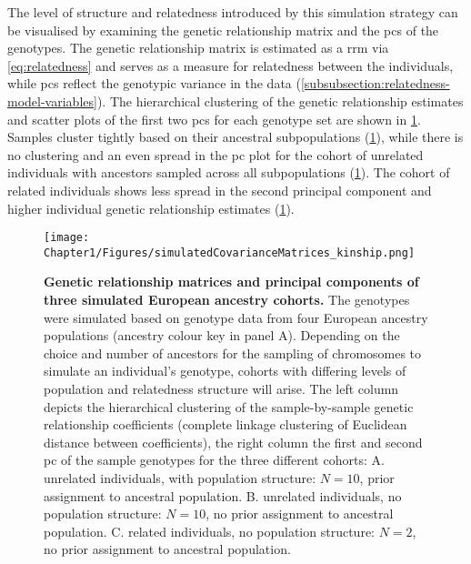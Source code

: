 The level of structure and relatedness introduced by this simulation strategy can be visualised by examining the genetic relationship matrix and the \glspl{pc} of the genotypes. The genetic relationship matrix is estimated as a \gls{rrm} via \cref{eq:relatedness} and serves as a measure for relatedness between the individuals, while \glspl{pc} reflect the genotypic variance in the data (\cref{subsubsection:relatedness-model-variables}). The hierarchical clustering of the genetic relationship estimates and scatter plots of the first two \glspl{pc} for each genotype set are shown in \cref{fig:kinship-matrices}. Samples cluster tightly based on their ancestral subpopulations (\cref{fig:kinship-matrices}), while there is no clustering and an even spread in the \gls{pc} plot for the cohort of unrelated individuals with ancestors sampled across all subpopulations (\cref{fig:kinship-matrices}). The cohort of related individuals shows less spread in the second principal component and higher individual genetic relationship estimates (\cref{fig:kinship-matrices}).


\begin{figure}[htbp]
	\centering
	\texttt{[image: Chapter1/Figures/simulatedCovarianceMatrices\_kinship.png]}
	\caption[\textbf{Genetic relationship matrices and principal components of three simulated European ancestry cohorts.}]{\textbf{Genetic relationship matrices and principal components of three simulated European ancestry cohorts.} The genotypes were simulated based on genotype data from four European ancestry populations (ancestry colour key in panel A). Depending on the choice and number of ancestors for the sampling of chromosomes to simulate an individual's genotype, cohorts with differing levels of population and relatedness structure will arise. The left column depicts the hierarchical clustering of the sample-by-sample  genetic relationship coefficients (complete linkage clustering of Euclidean distance between coefficients), the right column the first and second \gls{pc} of the sample genotypes for the three different cohorts: A. unrelated individuals, with population structure: \(N=10\), prior assignment to ancestral population. B. unrelated individuals, no population structure: \(N=10\), no prior assignment to ancestral population. C. related individuals, no population structure: \(N=2\), no prior assignment to ancestral population.}
 	\label{fig:kinship-matrices}
\end{figure}

